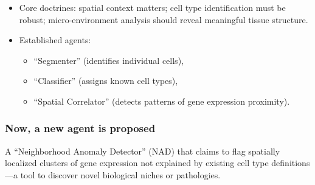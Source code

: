 \begin{itemize}

  \item Core doctrines: spatial context matters; cell type identification must
    be robust; micro-environment analysis should reveal meaningful tissue
    structure.

  \item Established agents:

  \begin{itemize}

    \item “Segmenter” (identifies individual cells),

    \item “Classifier” (assigns known cell types),

    \item “Spatial Correlator” (detects patterns of gene expression proximity).

  \end{itemize}

\end{itemize}

\subsubsection*{Now, a new agent is proposed}

A “Neighborhood Anomaly Detector” (NAD) that claims to flag spatially localized
clusters of gene expression not explained by existing cell type definitions—a
tool to discover novel biological niches or pathologies.

